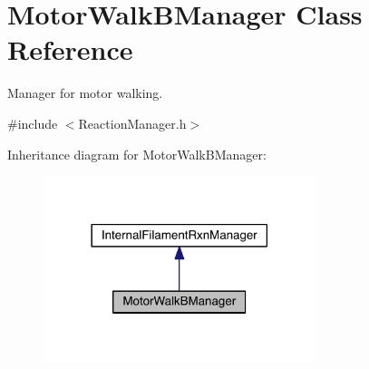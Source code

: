 \hypertarget{classMotorWalkBManager}{\section{Motor\+Walk\+B\+Manager Class Reference}
\label{classMotorWalkBManager}
}


Manager for motor walking.  




{\ttfamily \#include $<$Reaction\+Manager.\+h$>$}



Inheritance diagram for Motor\+Walk\+B\+Manager\+:\nopagebreak
\begin{figure}[H]
\begin{center}
\leavevmode
\includegraphics[width=225pt]{classMotorWalkBManager__inherit__graph}
\end{center}
\end{figure}


